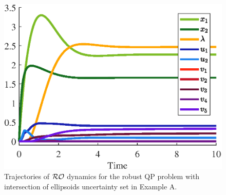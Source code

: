 \documentclass[journal,twoside,web]{ieeecolor}
\begin{document}
\begin{figure}
\begin{center}
\includegraphics[scale=0.55]{trajectories_intersection.eps}
\vspace{-1.5mm}
\caption{Trajectories of ${\cal RO}$ dynamics for the robust QP problem with intersection of ellipsoids uncertainty set in Example A.}
\label{trajectories_norm_intersection}
\end{center}
\end{figure}
\end{document}
